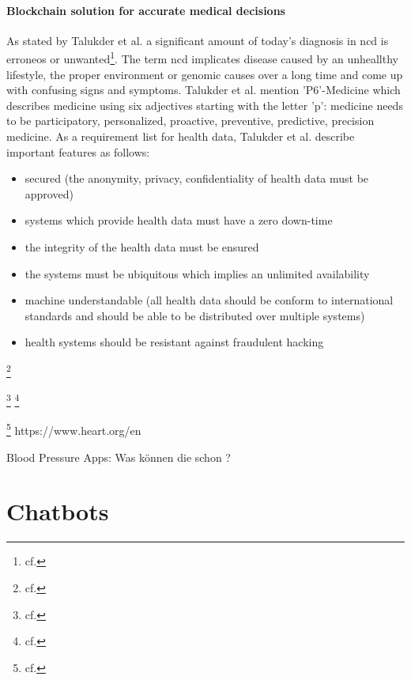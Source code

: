 \paragraph{Blockchain solution for accurate medical decisions}
As stated by Talukder et al. a significant amount of today's diagnosis in \ac{ncd} is erroneos or unwanted\footnote{cf.\autocite{talukder}}. The term \ac{ncd} implicates disease caused by an unheallthy lifestyle, the proper environment or genomic causes over a long time and come up with confusing signs and symptoms.
Talukder et al. mention 'P6'-Medicine which describes medicine using six adjectives starting with the letter 'p': medicine needs to be participatory, personalized, proactive, preventive, predictive, precision medicine.
As a requirement list for health data, Talukder et al. describe important features as follows: 

\begin{itemize}
\setlength\itemsep{-0.5em}
  \item secured (the anonymity, privacy, confidentiality of health data must be approved)
  \item systems which provide health data must have a zero down-time 
  \item the integrity of the health data must be ensured
  \item the systems must be ubiquitous which implies an unlimited availability
  \item machine understandable (all health data should be conform to international standards and should be able to be distributed over multiple systems)
  \item health systems should be resistant against fraudulent hacking
\end{itemize}


\footnote{cf.\autocite{kawohl}}

\footnote{cf.\autocite{white_blood_2007}}
\footnote{cf.\autocite{beevers_blood_2001}}

\footnote{cf.\autocite{alessa}}
https://www.heart.org/en



Blood Pressure Apps:
Was können die schon ? 
\section{Chatbots} 

